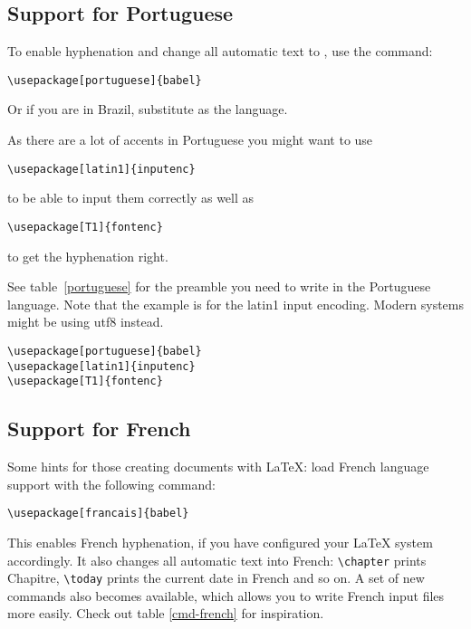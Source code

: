 \subsection{Support for Portuguese}

To enable hyphenation and change all automatic text to ,
 use the command:
\begin{lscommand}
\verb|\usepackage[portuguese]{babel}|
\end{lscommand}
Or if you are in Brazil, substitute \texttt{} as the language.

As there are a lot of accents in Portuguese you might want to use
\begin{lscommand}
\verb|\usepackage[latin1]{inputenc}|
\end{lscommand}
to be able to input them correctly as well as 
\begin{lscommand}
\verb|\usepackage[T1]{fontenc}|
\end{lscommand}
to get the hyphenation right.

See table~\ref{portuguese} for the preamble you need to write in the
Portuguese language. Note that the example is for the latin1 input encoding.
Modern systems might be using utf8 instead.

\begin{table}[btp]
\caption{Preamble for Portuguese documents.} \label{portuguese}
\begin{lined}{5cm}
\begin{verbatim}
\usepackage[portuguese]{babel}
\usepackage[latin1]{inputenc}
\usepackage[T1]{fontenc}
\end{verbatim}
\bigskip
\end{lined}
\end{table}


\subsection{Support for French}

Some hints for those creating  documents with \LaTeX{}:
load French language support with the following command:

\begin{lscommand}
\verb|\usepackage[francais]{babel}|
\end{lscommand}

This enables French hyphenation, if you have configured your
\LaTeX{} system accordingly. It also changes all automatic text into
French: \verb+\chapter+ prints Chapitre, \verb+\today+ prints the current
date in French and so on. A set of new commands also
becomes available, which allows you to write French input files more
easily. Check out table \ref{cmd-french} for inspiration. 


